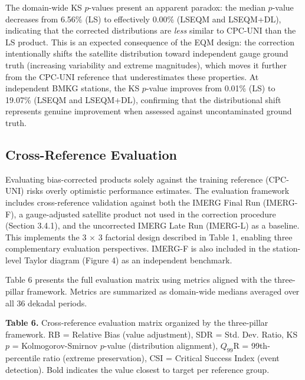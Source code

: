 \documentclass[11pt,a4paper]{article}
\begin{document}
The domain-wide KS \(p\)-values present an apparent paradox: the median
\(p\)-value decreases from 6.56\% (LS) to effectively 0.00\% (LSEQM and
LSEQM+DL), indicating that the corrected distributions are \emph{less}
similar to CPC-UNI than the LS product. This is an expected consequence
of the EQM design: the correction intentionally shifts the satellite
distribution toward independent gauge ground truth (increasing
variability and extreme magnitudes), which moves it further from the
CPC-UNI reference that underestimates these properties. At independent
BMKG stations, the KS \(p\)-value improves from 0.01\% (LS) to 19.07\%
(LSEQM and LSEQM+DL), confirming that the distributional shift
represents genuine improvement when assessed against uncontaminated
ground truth.

\subsection{Cross-Reference
Evaluation}\label{cross-reference-evaluation}

Evaluating bias-corrected products solely against the training reference
(CPC-UNI) risks overly optimistic performance estimates. The evaluation
framework includes cross-reference validation against both the IMERG
Final Run (IMERG-F), a gauge-adjusted satellite product not used in the
correction procedure (Section 3.4.1), and the uncorrected IMERG Late Run
(IMERG-L) as a baseline. This implements the 3 \(\times\) 3 factorial
design described in Table 1, enabling three complementary evaluation
perspectives. IMERG-F is also included in the station-level Taylor
diagram (Figure 4) as an independent benchmark.

Table 6 presents the full evaluation matrix using metrics aligned with
the three-pillar framework. Metrics are summarized as domain-wide
medians averaged over all 36 dekadal periods.

\textbf{Table 6.} Cross-reference evaluation matrix organized by the
three-pillar framework. RB = Relative Bias (value adjustment), SDR =
Std. Dev. Ratio, KS \(p\) = Kolmogorov-Smirnov \(p\)-value (distribution
alignment), \(Q_{99}\)R = 99th-percentile ratio (extreme preservation),
CSI = Critical Success Index (event detection). Bold indicates the value
closest to target per reference group.
\end{document}
